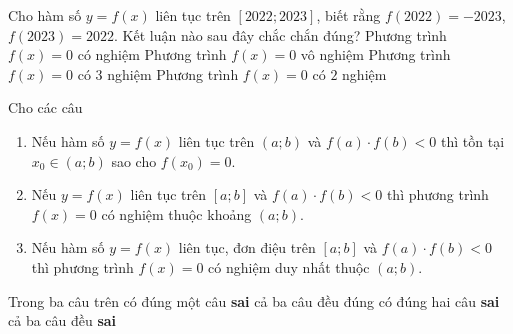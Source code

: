 \begin{ex}%
Cho hàm số $y=f(x)$ liên tục trên $[2022;2023]$, biết rằng $f(2022)=-2023$, $f(2023)=2022$. Kết luận nào sau đây chắc chắn đúng?
\choice
{\True Phương trình $f(x)=0$ có nghiệm}
{Phương trình $f(x)=0$ vô nghiệm}
{Phương trình $f(x)=0$ có $3$ nghiệm}
{Phương trình $f(x)=0$ có $2$ nghiệm}
\end{ex}

\begin{ex}%
	Cho các câu
	\begin{enumerate}
	\item Nếu hàm số $y=f(x)$ liên tục trên $(a;b)$ và $f(a) \cdot f(b)<0$ thì tồn tại $x_0 \in (a;b)$ sao cho $f\left(x_0 \right) = 0$.
	\item Nếu $y=f(x)$ liên tục trên $[a;b]$ và $f(a)\cdot f(b) <0$ thì phương trình $f(x) = 0$ có nghiệm thuộc khoảng $(a;b)$.
	\item Nếu hàm số $y=f(x)$ liên tục, đơn điệu trên $[a;b]$ và $f(a) \cdot f(b) <0$ thì phương trình $f\left( x \right)=0$ có nghiệm duy nhất thuộc $(a;b)$.
	\end{enumerate}
	Trong ba câu trên
\choice
{\True có đúng một câu {\bf sai}}
{cả ba câu đều đúng}
{có đúng hai câu {\bf sai}}
{cả ba câu đều {\bf sai}}
\end{ex}

